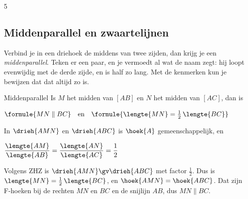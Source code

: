 \begin{alleenvoor}{5}
\subsection{Middenparallel en zwaartelijnen}

Verbind je in een driehoek de middens van twee zijden, dan krijg je een \emph{middenparallel}. Teken er een paar, en je vermoedt al wat de naam zegt: hij loopt evenwijdig met de derde zijde, en is half zo lang. Met de kenmerken kun je bewijzen dat dat altijd zo is.

\begin{theorie}
\begin{minipage}[t]{.62\linewidth}
\vspace{0pt}
\begin{stelling}{Middenparallel}
Is $M$ het midden van $[AB]$ en $N$ het midden van $[AC]$, dan is

\vspace{1mm}
\qquad $\formule{MN \parallel BC} \quad \text{en} \quad \formule{\lengte{MN} = \tfrac12\,\lengte{BC}}$
\end{stelling}

\begin{bewijs}
In $\drieh{AMN}$ en $\drieh{ABC}$ is $\hoek{A}$ gemeenschappelijk, en

\vspace{1mm}
\qquad $\dfrac{\lengte{AM}}{\lengte{AB}} = \dfrac{\lengte{AN}}{\lengte{AC}} = \dfrac12$

\vspace{1mm}
Volgens ZHZ is $\drieh{AMN} \gv \drieh{ABC}$ met factor $\tfrac12$. Dus is $\lengte{MN} = \tfrac12\,\lengte{BC}$, en $\hoek{AMN} = \hoek{ABC}$. Dat zijn F-hoeken bij de rechten $MN$ en $BC$ en de snijlijn $AB$, dus $MN \parallel BC$.
\end{bewijs}
\end{minipage}\hfill
\begin{minipage}[t]{.34\linewidth}
\vspace{0pt}
\centering
{}
\end{minipage}
\end{theorie}


\end{alleenvoor}
